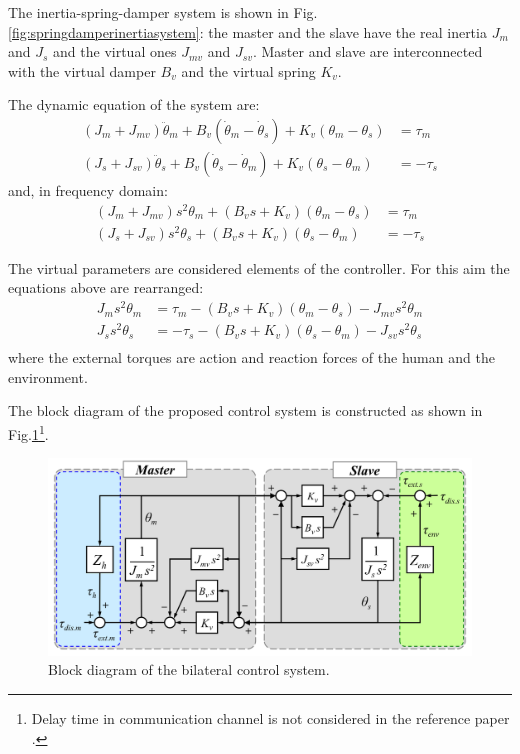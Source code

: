 The inertia-spring-damper system is shown in Fig.\ref{fig:springdamperinertiasystem}: the master and the slave have the real inertia $ J_m $ and $ J_s $ and the virtual ones $ J_{mv} $ and $ J_{sv} $. Master and slave are interconnected with the virtual damper $ B_v $ and the virtual spring $ K_v $.

The dynamic equation of the system are:
\begin{align}
	(J_m + J_{mv})\ddot{\theta}_m + B_v (\dot{\theta}_m - \dot{\theta}_s) + K_v(\theta_m - \theta_s) &= \tau_m \\
	(J_s + J_{sv})\ddot{\theta}_s + B_v (\dot{\theta}_s - \dot{\theta}_m) + K_v(\theta_s - \theta_m) &= - \tau_s 
\end{align}
and, in frequency domain:
\begin{align}
	(J_m + J_{mv}) s^2 \theta_m + (B_v s + K_v) (\theta_m - \theta_s) &= \tau_m \\
	(J_s + J_{sv}) s^2 \theta_s + (B_v s + K_v) (\theta_s - \theta_m) &= - \tau_s 
\end{align}

The virtual parameters are considered elements of the controller. For this aim the equations above are rearranged:
\begin{align}
	J_m s^2 \theta_m &= \tau_m - (B_v s + K_v) (\theta_m - \theta_s) - J_{mv} s^2 \theta_m \\
	J_s s^2 \theta_s &= - \tau_s - (B_v s + K_v) (\theta_s - \theta_m) - J_{sv} s^2 \theta_s \\
\end{align}
where the external torques are action and reaction forces of the human and the environment.

The block diagram of the proposed control system is constructed as shown in Fig.\ref{fig:blockdiagram}\footnote{Delay time in communication channel is not considered in the reference paper \cite{trakarnchaiyo2017vibration}.}.

\begin{figure}
	\centering
	\includegraphics[width=0.7\linewidth]{Images/Block_diagram}
	\caption[block_diagram]{Block diagram of the bilateral control system.}
	\label{fig:blockdiagram}
\end{figure}

